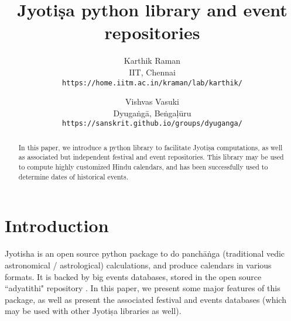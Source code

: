 \documentclass[11pt]{article}
\title{Jyotiṣa python library and event repositories}
\author{Karthik Raman \\
  IIT, Chennai \\
  {\tt https://home.iitm.ac.in/kraman/lab/karthik/}
\\}
\author{Vishvas Vasuki \\
  Dyugaṅgā, Beṅgaḷūru \\
  {\tt https://sanskrit.github.io/groups/dyuganga/}
\\}
\date{}
\begin{document}
\maketitle
\begin{abstract}
In this paper, we introduce a python library to facilitate Jyotiṣa computations, as well as associated but independent festival and event repositories. This library may be used to compute highly customized Hindu calendars, and has been successfully used to determine dates of historical events.
\end{abstract}

\section{Introduction}
Jyotisha \cite{jyotisha_py} is an open source python package to do panchāṅga (traditional vedic astronomical / astrological) calculations, and produce calendars in various formats. It is backed by big events databases, stored in the open source ``adyatithi" repository \cite{adyatithi}. In this paper, we present some major features of this package, as well as present the associated festival and events databases (which may be used with other Jyotiṣa libraries as well).





\end{document}
